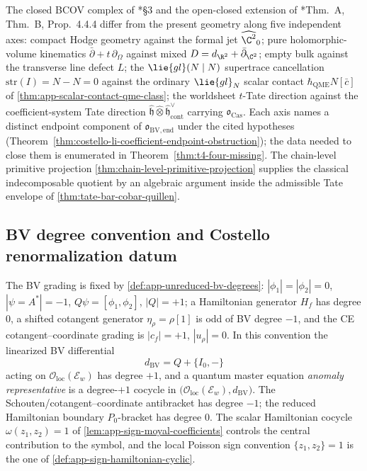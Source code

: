 The closed BCOV complex of \cite{costello-li-quantum-bcov}*{\S3} and the
open-closed extension of
\cite{costello-li-open-closed-bcov}*{Thm.~A, Thm.~B, Prop.~4.4.4} differ
from the present geometry along five independent axes: compact Hodge
geometry against the formal jet \(\widehat{\C^2}_0\); pure
holomorphic-volume kinematics \(\bar\partial+t\,\partial_\Omega\)
against mixed \(D=d_{\R^2}+\bar\partial_{\C^2}\); empty bulk against
the transverse line defect \(L\); the
\(\lie{gl}(N\mid N)\) supertrace cancellation
\(\mathrm{str}(I)=N-N=0\) against the ordinary
\(\lie{gl}_N\) scalar contact \(\hbar_{\mathrm{QME}} N[\bar c]\) of
\ref{thm:app-scalar-contact-qme-class}; the worldsheet \(t\)-Tate
direction against the coefficient-system Tate direction
\(\widehat{\mathfrak h}\widehat\otimes
\widehat{\mathfrak h}^{\vee}_{\mathrm{cont}}\) carrying
\(\mathfrak o_{\mathrm{Cas}}\).  Each axis names a distinct endpoint
component of \(\mathfrak o_{\mathrm{BV,end}}\) under the cited
hypotheses (Theorem~\ref{thm:costello-li-coefficient-endpoint-obstruction}); the
data needed to close them is enumerated in
Theorem~\ref{thm:t4-four-missing}.  The chain-level primitive projection
\ref{thm:chain-level-primitive-projection} supplies the classical
indecomposable quotient by an algebraic argument inside the admissible
Tate envelope of \ref{thm:tate-bar-cobar-quillen}.

\subsection*{BV degree convention and Costello renormalization datum}

\begin{rmk}
\label{rmk:t4-bv-degree-recall}
  The BV grading is fixed by
  \ref{def:app-unreduced-bv-degrees}: \(|\phi_1|=|\phi_2|=0\),
  \(|\psi=A^*|=-1\), \(Q\psi=[\phi_1,\phi_2]\), \(|Q|=+1\); a
  Hamiltonian generator \(H_f\) has degree \(0\), a shifted cotangent
  generator \(\eta_\rho=\rho[1]\) is odd of BV degree \(-1\), and the
  CE cotangent--coordinate grading is \(|c_f|=+1\), \(|u_\rho|=0\).  In
  this convention the linearized BV differential
  \[
    d_{\mathrm{BV}}=Q+\{I_0,-\}
  \]
  acting on \(\mathcal O_{\mathrm{loc}}(\mathcal E_w)\) has degree
  \(+1\), and a quantum master equation \emph{anomaly representative}
  is a degree-\(+1\) cocycle in
  \(\bigl(\mathcal O_{\mathrm{loc}}(\mathcal E_w),d_{\mathrm{BV}}\bigr)\).  The
  Schouten/cotangent--coordinate antibracket has degree \(-1\); the
  reduced Hamiltonian boundary \(P_0\)-bracket has degree \(0\).  The
  scalar Hamiltonian cocycle
  \(\omega(z_1,z_2)=1\) of \ref{lem:app-sign-moyal-coefficients}
  controls the central contribution to the symbol, and the local
  Poisson sign convention \(\{z_1,z_2\}=1\) is the one of
  \ref{def:app-sign-hamiltonian-cyclic}.
\end{rmk}


